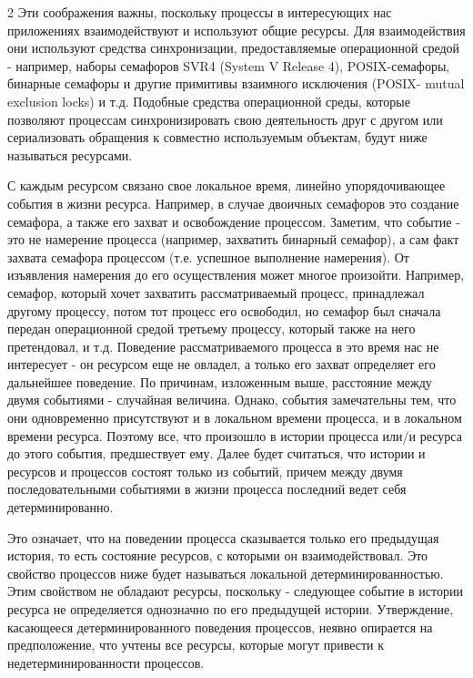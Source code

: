 \begin{multicols}{2}
Эти соображения важны, поскольку процессы в интересующих нас приложениях взаимодействуют и используют общие ресурсы. Для взаимодействия они используют средства синхронизации, предоставляемые операционной средой - например, наборы семафоров SVR4 (System V Release 4), POSIX-семафоры, бинарные семафоры и другие примитивы взаимного исключения (POSIX- mutual exclusion locks) и т.д. Подобные средства операционной среды, которые позволяют процессам синхронизировать свою деятельность друг с другом или сериализовать обращения к совместно используемым объектам,  будут ниже  называться ресурсами.



С каждым ресурсом связано свое локальное время, линейно упорядочивающее события в жизни ресурса. Например, в случае двоичных семафоров это создание семафора, а также его захват и освобождение процессом. Заметим, что событие - это не намерение процесса (например, захватить бинарный семафор), а сам факт захвата семафора процессом (т.е. успешное выполнение намерения). От изъявления намерения до его осуществления может многое произойти. Например, семафор, который хочет захватить рассматриваемый процесс, принадлежал другому процессу, потом тот процесс его освободил, но семафор был сначала передан операционной средой третьему процессу, который также на него претендовал, и т.д. Поведение рассматриваемого процесса в это время нас не интересует - он ресурсом еще не овладел, а только его захват определяет его дальнейшее поведение. По причинам,  изложенным выше, расстояние между двумя событиями - случайная величина. Однако, события замечательны тем, что они одновременно присутствуют и в локальном времени процесса, и в локальном времени ресурса. Поэтому все, что произошло в истории процесса или/и ресурса до этого события, предшествует ему. Далее  будет считаться, что истории и ресурсов и процессов состоят только из событий, причем между двумя последовательными событиями в жизни процесса последний ведет себя детерминированно.



Это означает, что на  поведении процесса сказывается только его предыдущая история, то есть состояние ресурсов, с которыми он взаимодействовал. Это свойство процессов ниже будет называться локальной детерминированностью. Этим свойством не обладают ресурсы, поскольку - следующее событие в истории ресурса не определяется однозначно по его предыдущей истории. Утверждение, касающееся детерминированного поведения процессов, неявно опирается на предположение,  что учтены все ресурсы, которые могут привести к  недетерминированности процессов.




\end{multicols}
